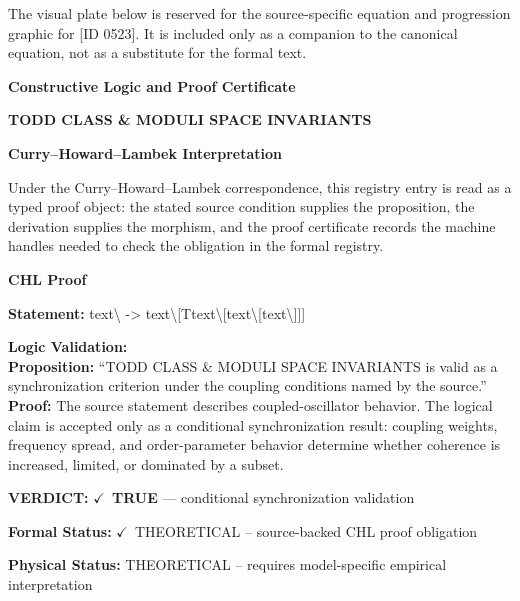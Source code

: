 \begingroup\footnotesize\sloppy
The visual plate below is reserved for the source-specific equation and progression graphic for [ID 0523]. It is included only as a companion to the canonical equation, not as a substitute for the formal text.
\par\endgroup
\ifTZPDarkEdition
{}
\fi

\clearpage
\begingroup\tzpsupportsetup
\noindent\textbf{\fontsize{10.8pt}{12.8pt}\selectfont [ID 0523] Constructive Logic and Proof Certificate}\par
\noindent\textbf{\fontsize{10pt}{12pt}\selectfont TODD CLASS \& MODULI SPACE INVARIANTS}\par
\vspace{0.45em}
\begingroup
\footnotesize
\setlength{\parskip}{0.22em}
\setlength{\parindent}{0pt}
\noindent\textbf{Curry--Howard--Lambek Interpretation}\par
Under the Curry--Howard--Lambek correspondence, this registry entry is read as a typed proof
object: the stated source condition supplies the proposition, the derivation supplies the
morphism, and the proof certificate records the machine handles needed to check the obligation
in the formal registry.

\vspace{0.45em}
\noindent\textbf{CHL Proof}\par
\textbf{Statement:} text\textbackslash{} -> text\textbackslash{}[Ttext\textbackslash{}[text\textbackslash{}[text\textbackslash{}]]]

\textbf{Logic Validation:}\\
\textbf{Proposition:} ``TODD CLASS \& MODULI SPACE INVARIANTS is valid as a synchronization criterion under the
coupling conditions named by the source.''\\
\textbf{Proof:} The source statement describes coupled-oscillator behavior. The logical claim is
accepted only as a conditional synchronization result: coupling weights, frequency
spread, and order-parameter behavior determine whether coherence is increased, limited,
or dominated by a subset.

\textbf{VERDICT:} \ensuremath{\checkmark}\ \textbf{TRUE} --- conditional synchronization validation

\textbf{Formal Status:} \ensuremath{\checkmark}\ THEORETICAL -- source-backed CHL proof obligation

\textbf{Physical Status:} THEORETICAL -- requires model-specific empirical interpretation
\par\vspace{0.45em}
\par
\ifTZPDarkEdition
{}
\fi
\endgroup
\endgroup
